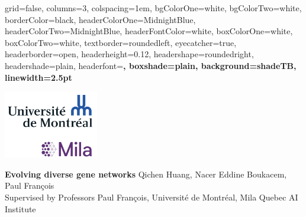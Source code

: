 \documentclass[a0paper,final,landscape]{baposter}
\theoremstyle{plain}
\theoremstyle{definition}
\begin{document}
\begin{poster}{%
  grid=false,
  columns=3,
  colspacing=1em,
  bgColorOne=white,
  bgColorTwo=white,
  borderColor=black, %
  headerColorOne=MidnightBlue, %
  headerColorTwo=MidnightBlue, %
  headerFontColor=white, %
  boxColorOne=white, %
  boxColorTwo=white,
  textborder=roundedleft,
  eyecatcher=true,
  headerborder=open,
  headerheight=0.12\textheight,
  headershape=roundedright,
  headershade=plain,
  headerfont=\large\bfseries\textsf, %
  boxshade=plain,
  background=shadeTB,
  linewidth=2.5pt
  }
  {%
  {\begin{minipage}{5em}
    \vspace{1em}
    \includegraphics[height=8em]{./imagesnew/a-udem-logo2.png} 
  \hfill
  \end{minipage}
  }
  } %
  {\sf\huge\bfseries\centering %
  Evolving diverse gene networks
  }
  {\centering\sf %
  Qichen Huang,
  Nacer Eddine Boukacem,
  Paul François\hspace{3em}\\
  {\smaller
      Supervised by Professors Paul François, Université de Montréal, Mila Quebec AI Institute\\
  }
  }



\end{poster}
\end{document}
